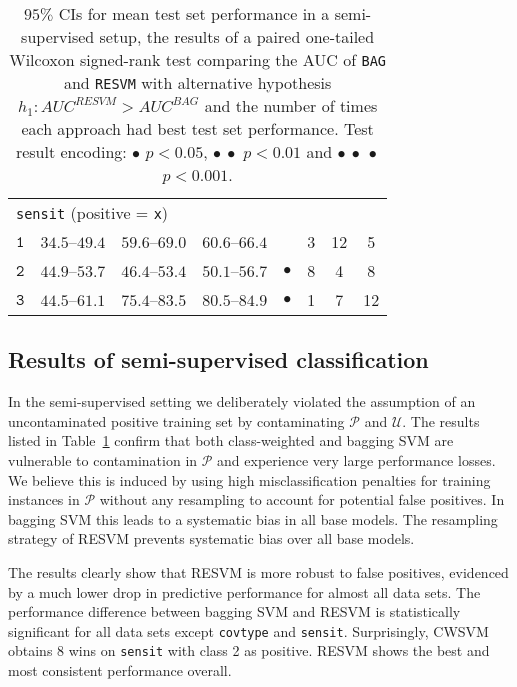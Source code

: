 \documentclass[preprint,elsarticle-num,12pt]{elsarticle}
\newcommand{\resvm}{RESVM}
\begin{document}
\begin{table}[!h]
\begin{tabular}{cccccccc}
\multicolumn{3}{l}{\texttt{sensit} (positive = \texttt{x})} \\
$\texttt{1}$ & $34.5$--$49.4$ & $59.6$--$69.0$ & $60.6$--$66.4$ &  & 3 & 12 & 5\\ 
$\texttt{2}$ & $44.9$--$53.7$ & $46.4$--$53.4$ & $50.1$--$56.7$ & $\bullet$ & 8 & 4 & 8\\ 
$\texttt{3}$ & $44.5$--$61.1$ & $75.4$--$83.5$ & $80.5$--$84.9$ & $\bullet$ & 1 & 7 & 12\\ 
\bottomrule
\end{tabular}
\caption{$95\%$ CIs for mean test set performance in a semi-supervised setup, the results of a paired one-tailed Wilcoxon signed-rank test comparing the AUC of \texttt{BAG} and \texttt{\resvm} with alternative hypothesis $h_1: AUC^{\resvm} > AUC^{BAG}$ and the number of times each approach had best test set performance.
Test result encoding: $\bullet$ $p < 0.05$, $\bullet\ \bullet$ $p < 0.01$ and $\bullet\ \bullet\ \bullet$ $p < 0.001$.
}
\label{table:semisupervised}
\end{table}


\subsection{Results of semi-supervised classification}
In the semi-supervised setting we deliberately violated the assumption of an uncontaminated positive training set by contaminating $\mathcal{P}$ and $\mathcal{U}$. The results listed in Table~\ref{table:semisupervised} confirm that both class-weighted and bagging SVM are vulnerable to contamination in $\mathcal{P}$ and experience very large performance losses. We believe this is induced by using high misclassification penalties for training instances in $\mathcal{P}$ without any resampling to account for potential false positives. In bagging SVM this leads to a systematic bias in all base models. The resampling strategy of RESVM prevents systematic bias over all base models. 

The results clearly show that RESVM is more robust to false positives, evidenced by a much lower drop in predictive performance for almost all data sets. The performance difference between bagging SVM and RESVM is statistically significant for all data sets except \texttt{covtype} and \texttt{sensit}. Surprisingly, CWSVM obtains 8 wins on \texttt{sensit} with class 2 as positive. RESVM shows the best and most consistent performance overall. 
\end{document}
